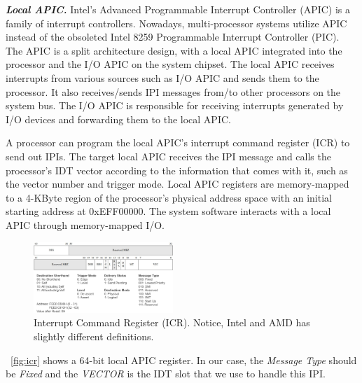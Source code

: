 \textbf{\textit{Local APIC.}} Intel's Advanced Programmable Interrupt Controller (APIC) is a family of interrupt controllers. Nowadays, multi-processor systems utilize APIC instead of the obsoleted Intel 8259 Programmable Interrupt Controller (PIC). The APIC is a split architecture design, with a local APIC integrated into the processor and the I/O APIC on the system chipset. The local APIC receives interrupts from various sources such as I/O APIC and sends them to the processor. It also receives/sends IPI messages from/to other processors on the system bus. The I/O APIC is responsible for receiving interrupts generated by I/O devices and forwarding them to the local APIC. 

A processor can program the local APIC's interrupt command register (ICR) to send out IPIs. The target local APIC receives the IPI message and calls the processor's IDT vector according to the information that comes with it, such as the vector number and trigger mode. Local APIC registers are memory-mapped to a 4-KByte region of the processor's physical address space with an initial starting address at 0xEFF00000. The system software interacts with a local APIC through memory-mapped I/O. 


\begin{figure}[th]
  \includegraphics[width=0.47\textwidth]{figures/icr2}
  \centering
  \caption{Interrupt Command Register (ICR). Notice, Intel and AMD has slightly different definitions.~\cite{intelapic}~\cite{amdapic}}
  \label{fig:icr}
\end{figure}



~\autoref{fig:icr} shows a 64-bit local APIC register.  In our case, the \textit{Message Type} should be \textit{Fixed} and the \textit{VECTOR} is the IDT slot that we use to handle this IPI.
